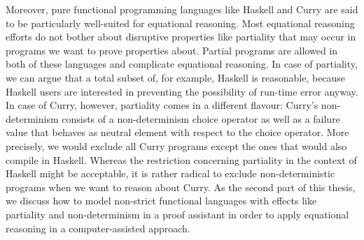 Moreover, pure functional programming languages like Haskell and Curry are said to be particularly well-suited for equational reasoning.
Most equational reasoning efforts do not bother about disruptive properties like partiality that may occur in programs we want to prove properties about.
Partial programs are allowed in both of these languages and complicate equational reasoning.
In case of partiality, we can argue that a total subset of, for example, Haskell is reasonable, because Haskell users are interested in preventing the possibility of run-time error anyway.
In case of Curry, however, partiality comes in a different flavour: Curry's non-determinism consists of a non-determinism choice operator as well as a failure value that behaves as neutral element with respect to the choice operator.
More precisely, we would exclude all Curry programs except the ones that would also compile in Haskell.
Whereas the restriction concerning partiality in the context of Haskell might be acceptable, it is rather radical to exclude non-deterministic programs when we want to reason about Curry.
As the second part of this thesis, we discuss how to model non-strict functional languages with effects like partiality and non-determinism in a proof assistant in order to apply equational reasoning in a computer-assisted approach.
